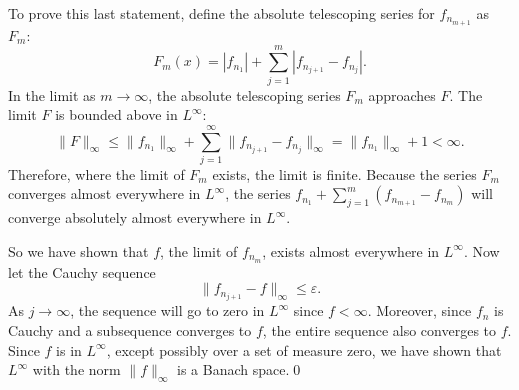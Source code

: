 To prove this last statement, define the absolute telescoping series for $f_{n_{m+1}}$ as $F_m$:
$$F_m(x)=|f_{n_1}|+\sum^m_{j=1}|f_{n_{j+1}}-f_{n_j}|.$$
In the limit as $m\to\infty$, the absolute telescoping series $F_m$ approaches $F$.
The limit $F$ is bounded above in $L^\infty$:
$$\|F\|_\infty\leq\|f_{n_1}\|_\infty+\sum_{j=1}^\infty\|f_{n_{j+1}}-f_{n_j}\|_\infty=\|f_{n_1}\|_\infty+1<\infty.$$
Therefore, where the limit of $F_m$ exists, the limit is finite.
Because the series $F_m$ converges almost everywhere in $L^\infty$, the series $f_{n_1}+\sum_{j=1}^m(f_{n_{m+1}}-f_{n_m})$ will converge absolutely almost everywhere in $L^\infty$.

So we have shown that $f$, the limit of $f_{n_m}$, exists almost everywhere in $L^\infty$.
Now let the Cauchy sequence
$$\|f_{n_{j+1}}-f\|_\infty\leq\varepsilon.$$
As $j\to\infty$, the sequence will go to zero in $L^\infty$ since $f<\infty$.
Moreover, since $f_n$ is Cauchy and a subsequence converges to $f$, the entire sequence also converges to $f$.
Since $f$ is in $L^\infty$, except possibly over a set of measure zero, we have shown that $L^\infty$ with the norm $\|f\|_\infty$ is a Banach space.\hfill\qed\kern3pt
\bye
